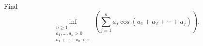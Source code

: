 Find
$$ \inf_{\substack{ n\ge 1 \\ a_1,\ldots ,a_n >0 \\ a_1+\cdots +a_n <\pi }} \left( \sum_{j=1}^n a_j\cos \left( a_1+a_2+\cdots +a_j \right)\right) . $$